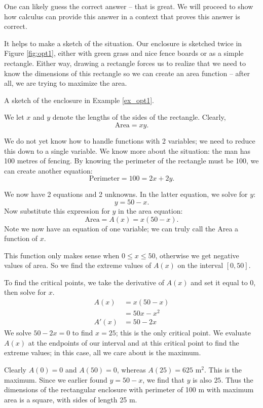 {One can likely guess the correct answer -- that is great. We will proceed to show how calculus can provide this answer in a context that proves this answer is correct.

It helps to make a sketch of the situation. Our enclosure is sketched twice in Figure \ref{fig:opt1}, either with green grass and nice fence boards or as a simple rectangle. Either way, drawing a rectangle forces us to realize that we need to know the dimensions of this rectangle so we can create an area function -- after all, we are trying to maximize the area.

{\noindent\begin{center}
\captionsetup{type=figure}%
\caption{A sketch of the enclosure in Example \ref{ex_opt1}.}\label{fig:opt1}
\end{center}
} %
{
} %


We let $x$ and $y$ denote the lengths of the sides of the rectangle. Clearly, 
\[
\text{Area}=xy.
\]

We do not yet know how to handle functions with 2 variables; we need to reduce this down to a single variable. We know more about the situation: the man has 100 metres of fencing. By knowing the perimeter of the rectangle must be 100, we can create another equation: 
\[
\text{Perimeter} = 100 = 2x+2y.
\]

We now have 2 equations and 2 unknowns. In the latter equation, we solve for $y$:
\[
y = 50-x.
\]
 Now substitute this expression for $y$ in the area equation:
\[
 \text{Area} = A(x) = x(50-x).
 \]
  Note we now have an equation of one variable; we can truly call the Area a function of $x$. 

This function only makes sense when $0\leq x \leq 50$, otherwise we get negative values of area. So we find the extreme values of $A(x)$ on the interval $[0,50]$. 

To find the critical points, we take the derivative of $A(x)$ and set it equal to 0, then solve for $x$.
\begin{align*}
A(x) &= x(50-x) \\
			&= 50x-x^2 \\
A'(x) 	&= 50-2x
\end{align*}
We solve $50-2x=0$ to find $x=25$; this is the only critical point. We evaluate $A(x)$ at the endpoints of our interval and at this critical point to find the extreme values; in this case, all we care about is the maximum.

Clearly $A(0)=0$ and $A(50)=0$, whereas $A(25) = 625 \text{ m}^2$. This is the maximum. Since we earlier found $y = 50-x$, we find that $y$ is also $25$. Thus the dimensions of the rectangular enclosure with perimeter of 100 m with maximum area is a square, with sides of length 25 m.
}\\

